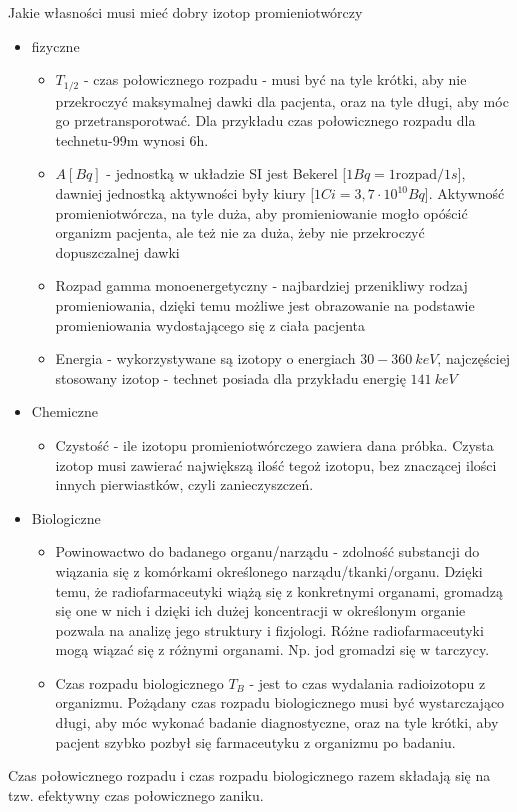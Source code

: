 \documentclass{article}
\begin{document}
Jakie własności musi mieć dobry izotop promieniotwórczy
\begin{itemize}
    \item fizyczne \begin{itemize}
        \item $T_{1/2}$ - czas połowicznego rozpadu - musi być na tyle krótki, aby nie przekroczyć maksymalnej dawki dla pacjenta, oraz na tyle długi, aby móc go przetransporotwać. Dla przykładu czas połowicznego rozpadu dla technetu-99m wynosi 6h.
        \item $A [Bq]$ - jednostką w układzie SI jest Bekerel [$1 Bq = 1\mathrm{rozpad} / 1s$], dawniej jednostką aktywności były kiury [$1 Ci = 3,7 \cdot 10^{10} Bq$]. Aktywność promieniotwórcza, na tyle duża, aby promieniowanie mogło opóścić organizm pacjenta, ale też nie za duża, żeby nie przekroczyć dopuszczalnej dawki
        \item Rozpad gamma monoenergetyczny - najbardziej przenikliwy rodzaj promieniowania, dzięki temu możliwe jest obrazowanie na podstawie promieniowania wydostającego się z ciała pacjenta
        \item Energia - wykorzystywane są izotopy o energiach $30 - 360~keV$, najczęściej stosowany izotop - technet posiada dla przykładu energię $141~keV$
    \end{itemize}
    \item Chemiczne \begin{itemize}
        \item Czystość - ile izotopu promieniotwórczego zawiera dana próbka. Czysta izotop musi zawierać największą ilość tegoż izotopu, bez znaczącej ilości innych pierwiastków, czyli zanieczyszczeń. 
    \end{itemize}
    \item Biologiczne \begin{itemize}
        \item Powinowactwo do badanego organu\slash narządu - zdolność substancji do wiązania się z komórkami określonego narządu\slash tkanki\slash organu. Dzięki temu, że radiofarmaceutyki wiążą się z konkretnymi organami, gromadzą się one w nich i dzięki ich dużej koncentracji w określonym organie pozwala na analizę jego struktury i fizjologi. Różne radiofarmaceutyki mogą wiązać się z różnymi organami. Np. jod gromadzi się w tarczycy.
        \item Czas rozpadu biologicznego $T_B$ - jest to czas wydalania radioizotopu z organizmu. Pożądany czas rozpadu biologicznego musi być wystarczająco długi, aby móc wykonać badanie diagnostyczne, oraz na tyle krótki, aby pacjent szybko pozbył się farmaceutyku z organizmu po badaniu.
    \end{itemize}
\end{itemize}

Czas połowicznego rozpadu i czas rozpadu biologicznego razem składają się na tzw. efektywny czas połowicznego zaniku.   
\end{document}
